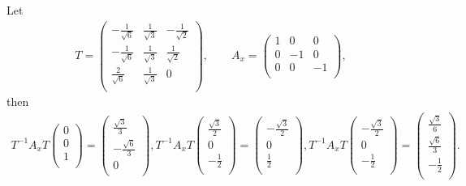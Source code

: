 \documentclass{amsart}
\begin{document}
Let
\begin{align*}
T = \left(
      \begin{array}{ccc}
        -\frac{1}{\sqrt{6}} & \frac{1}{\sqrt{3}} & -\frac{1}{\sqrt{2}} \\
        -\frac{1}{\sqrt{6}} & \frac{1}{\sqrt{3}} & \frac{1}{\sqrt{2}} \\
        \frac{2}{\sqrt{6}} & \frac{1}{\sqrt{3}} & 0 \\
      \end{array}
    \right), \qquad
A_{x} = \left(
          \begin{array}{ccc}
            1 & 0 & 0 \\
            0 & -1 & 0 \\
            0 & 0 & -1 \\
          \end{array}
        \right),
\end{align*}
then
\begin{align*}
T^{-1}A_{x}T\left(
              \begin{array}{c}
                0 \\
                0 \\
                1 \\
              \end{array}
            \right)
= \left(
    \begin{array}{c}
      \frac{\sqrt{3}}{3} \\
      -\frac{\sqrt{6}}{3} \\
      0 \\
    \end{array}
  \right),
T^{-1}A_{x}T\left(
              \begin{array}{c}
                \frac{\sqrt{3}}{2} \\
                0 \\
                -\frac{1}{2} \\
              \end{array}
            \right)
= \left(
    \begin{array}{c}
      -\frac{\sqrt{3}}{2} \\
      0 \\
      \frac{1}{2} \\
    \end{array}
  \right),
T^{-1}A_{x}T\left(
              \begin{array}{c}
                -\frac{\sqrt{3}}{2} \\
                0 \\
                -\frac{1}{2} \\
              \end{array}
            \right)
= \left(
    \begin{array}{c}
      \frac{\sqrt{3}}{6} \\
      \frac{\sqrt{6}}{3}  \\
      -\frac{1}{2} \\
    \end{array}
  \right).
\end{align*}
\end{document}
